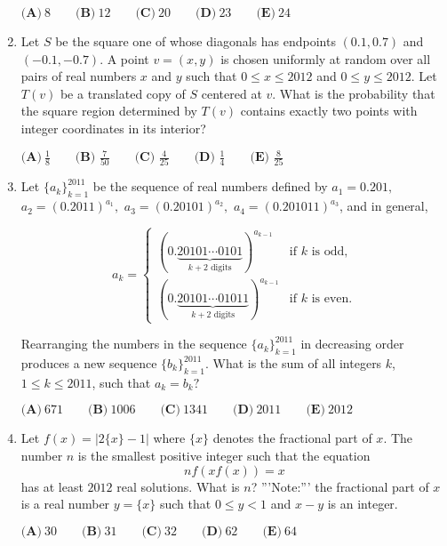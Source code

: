 \documentclass{article}
\begin{document}
\begin{enumerate}[label=\arabic*., itemsep=0.5em]
$ \textbf{(A)}\ 8\qquad\textbf{(B)}\ 12\qquad\textbf{(C)}\ 20\qquad\textbf{(D)}\ 23\qquad\textbf{(E)}\ 24 $\par \vspace{0.5em}\item Let $S$ be the square one of whose diagonals has endpoints $(0.1,0.7)$ and $(-0.1,-0.7)$.  A point $v=(x,y)$ is chosen uniformly at random over all pairs of real numbers $x$ and $y$ such that $0 \le x \le 2012$ and $0\le y\le 2012$.  Let $T(v)$ be a translated copy of $S$ centered at $v$.  What is the probability that the square region determined by $T(v)$ contains exactly two points with integer coordinates in its interior?

$ \textbf{(A)}\ \frac{1}{8}\qquad\textbf{(B) }\frac{7}{50}\qquad\textbf{(C) }\frac{4}{25}\qquad\textbf{(D) }\frac{1}{4}\qquad\textbf{(E) }\frac{8}{25} $\par \vspace{0.5em}\item Let $\{a_k\}_{k=1}^{2011}$ be the sequence of real numbers defined by $a_1=0.201,$ $a_2=(0.2011)^{a_1},$ $a_3=(0.20101)^{a_2},$ $a_4=(0.201011)^{a_3}$, and in general, 


\begin{equation*}
a_k=\begin{cases}
(0.\underbrace{20101\cdots 0101}_{k+2\text{ digits}})^{a_{k-1}} & \text{if }k\text{ is odd,}\\
(0.\underbrace{20101\cdots 01011}_{k+2\text{ digits}})^{a_{k-1}}& \text{if }k\text{ is even.}
\end{cases}
\end{equation*}


Rearranging the numbers in the sequence  $\{a_k\}_{k=1}^{2011}$ in decreasing order produces a new sequence  $\{b_k\}_{k=1}^{2011}$.  What is the sum of all integers $k$, $1\le k \le 2011$, such that $a_k=b_k?$

$ \textbf{(A)}\ 671\qquad\textbf{(B)}\ 1006\qquad\textbf{(C)}\ 1341\qquad\textbf{(D)}\ 2011\qquad\textbf{(E)}\ 2012 $\par \vspace{0.5em}\item Let $f(x)=|2\{x\}-1|$ where $\{x\}$ denotes the fractional part of $x$.  The number $n$ is the smallest positive integer such that the equation 
\begin{equation*}
nf(xf(x))=x
\end{equation*}
 has at least $2012$ real solutions.  What is $n$?  '''Note:''' the fractional part of $x$ is a real number $y=\{x\}$ such that $0\le y<1$ and $x-y$ is an integer.

$ \textbf{(A)}\ 30\qquad\textbf{(B)}\ 31\qquad\textbf{(C)}\ 32\qquad\textbf{(D)}\ 62\qquad\textbf{(E)}\ 64 $\par \vspace{0.5em}\end{enumerate}
\end{document}
